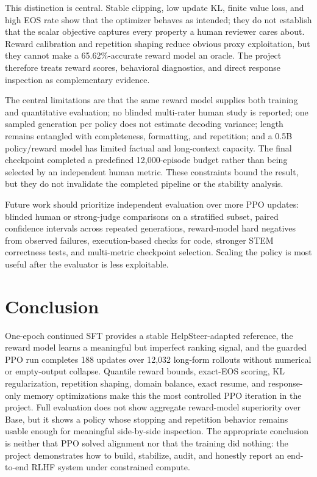 \documentclass[10pt,twocolumn]{article}
\begin{document}
This distinction is central. Stable clipping, low update KL, finite value loss,
and high EOS rate show that the optimizer behaves as intended; they do not
establish that the scalar objective captures every property a human reviewer
cares about. Reward calibration and repetition shaping reduce obvious proxy
exploitation, but they cannot make a 65.62\%-accurate reward model an oracle.
The project therefore treats reward scores, behavioral diagnostics, and direct
response inspection as complementary evidence.

The central limitations are that the same reward model supplies both training
and quantitative evaluation; no blinded multi-rater human study is reported;
one sampled generation per policy does not estimate decoding variance; length
remains entangled with completeness, formatting, and repetition; and a 0.5B
policy/reward model has limited factual and long-context capacity. The final
checkpoint completed a predefined 12,000-episode budget rather than being
selected by an independent human metric. These constraints bound the result,
but they do not invalidate the completed pipeline or the stability analysis.

Future work should prioritize independent evaluation over more PPO updates:
blinded human or strong-judge comparisons on a stratified subset, paired
confidence intervals across repeated generations, reward-model hard negatives
from observed failures, execution-based checks for code, stronger STEM
correctness tests, and multi-metric checkpoint selection. Scaling the policy is
most useful after the evaluator is less exploitable.

\section{Conclusion}

One-epoch continued SFT provides a stable HelpSteer-adapted reference, the
reward model learns a meaningful but imperfect ranking signal, and the guarded
PPO run completes 188 updates over 12,032 long-form rollouts without numerical
or empty-output collapse. Quantile reward bounds, exact-EOS scoring, KL
regularization, repetition shaping, domain balance, exact resume, and
response-only memory optimizations make this the most controlled PPO iteration
in the project. Full evaluation does not show aggregate reward-model
superiority over Base, but it shows a policy whose stopping and repetition
behavior remains usable enough for meaningful side-by-side inspection. The
appropriate conclusion is neither that PPO solved alignment nor that the
training did nothing: the project demonstrates how to build, stabilize, audit,
and honestly report an end-to-end RLHF system under constrained compute.
\end{document}
